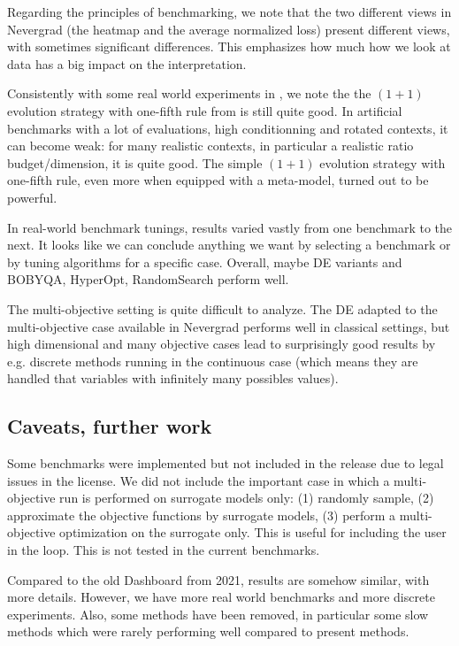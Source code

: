 Regarding the principles of benchmarking, we note that the two different views in Nevergrad (the heatmap and the average
normalized loss) present different views, with sometimes significant differences. This emphasizes how much how we look at data has a big impact on the interpretation.

%
%
%
%

Consistently with some real world experiments in \cite{micropredictions1,micropredictions2}, we note the the $(1+1)$ evolution strategy with one-fifth rule from \cite{rechenberg73} is still quite good. In artificial benchmarks with a lot of evaluations, high conditionning and rotated contexts, it can become weak: for many realistic contexts, in particular a realistic ratio budget/dimension, it is quite good.
The simple $(1+1)$ evolution strategy with one-fifth rule, even more when equipped with a meta-model, turned out to be powerful.

In real-world benchmark tunings, results varied vastly from one benchmark to the next.  It looks like we can conclude 
anything we want by selecting a benchmark or by tuning algorithms for a specific case. Overall, maybe DE variants and
BOBYQA, HyperOpt, RandomSearch perform well.

The multi-objective setting is quite difficult to analyze. The DE adapted to the multi-objective case available in
Nevergrad\cite{pde,mode} performs well in classical settings, but high dimensional and many objective cases lead to surprisingly good
results  by e.g. discrete methods running in the continuous case (which means they are handled that variables with
infinitely many possibles values).

\subsection{Caveats, further work}
Some benchmarks were implemented but not included in the release due to legal issues in the license. 
We did not include the important case in which a multi-objective run is performed on surrogate models only: (1) randomly sample, (2) approximate the objective functions by surrogate models, (3) perform a multi-objective optimization on the surrogate only. This is useful for including the user in the loop. This is not tested in the current benchmarks.

Compared to the old Dashboard from 2021, results are somehow similar, with more details. However, we have more real world benchmarks and more discrete experiments. Also,
some methods have been removed, in particular some slow methods which were rarely performing well compared to present methods.
